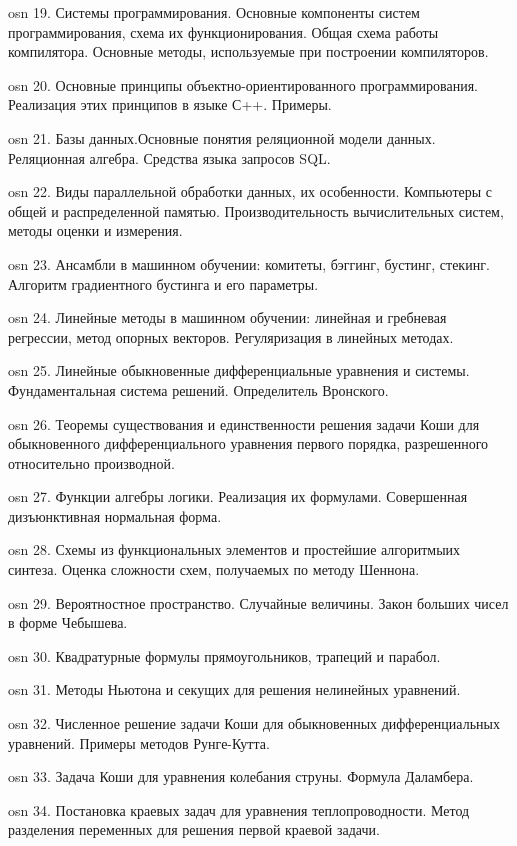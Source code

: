osn 19. Системы программирования. Основные компоненты систем программирования, схема их функционирования. Общая схема работы компилятора. Основные методы, используемые при построении компиляторов.

osn 20. Основные принципы объектно-ориентированного программирования. Реализация этих принципов в языке С++. Примеры.

osn 21. Базы данных.Основные понятия реляционной модели данных. Реляционная алгебра. Средства языка запросов SQL.

osn 22. Виды параллельной обработки данных, их особенности. Компьютеры с общей и распределенной памятью. Производительность вычислительных систем, методы оценки и измерения.

osn 23. Ансамбли в машинном обучении: комитеты, бэггинг, бустинг, стекинг. Алгоритм градиентного бустинга и его
параметры.

osn 24. Линейные методы в машинном обучении: линейная и гребневая регрессии, метод опорных векторов.
Регуляризация в линейных методах.

osn 25. Линейные обыкновенные дифференциальные уравнения и системы. Фундаментальная система решений. Определитель Вронского.

osn 26. Теоремы существования и единственности решения задачи Коши для обыкновенного дифференциального уравнения первого порядка, разрешенного относительно производной.

osn 27. Функции алгебры логики. Реализация их формулами. Совершенная дизъюнктивная нормальная форма.

osn 28. Схемы из функциональных элементов и простейшие алгоритмыих синтеза. Оценка сложности схем, получаемых по методу Шеннона.

osn 29. Вероятностное пространство. Случайные величины. Закон больших чисел в форме Чебышева.

osn 30. Квадратурные формулы прямоугольников, трапеций и парабол.

osn 31. Методы Ньютона и секущих для решения нелинейных уравнений.

osn 32. Численное решение задачи Коши для обыкновенных дифференциальных уравнений. Примеры методов Рунге-Кутта.

osn 33. Задача Коши для уравнения колебания струны. Формула Даламбера.

osn 34. Постановка краевых задач для уравнения теплопроводности.  Метод разделения переменных для решения первой краевой задачи.
